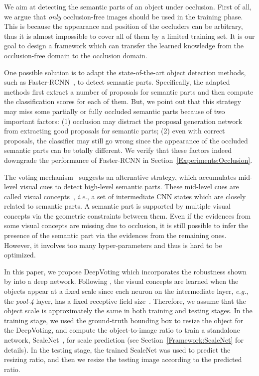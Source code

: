 \documentclass[10pt,twocolumn,letterpaper]{article}
\begin{document}
  We aim at detecting the semantic parts of an object under occlusion. First of all, we argue that {\em only} occlusion-free images should be used in the training phase. This is because the appearance and position of the occluders can be arbitrary, thus it is almost impossible to cover all of them by a limited training set. It is our goal to design a framework which can transfer the learned knowledge from the occlusion-free domain to the occlusion domain.

  One possible solution is to adapt the state-of-the-art object detection methods, such as Faster-RCNN~\cite{Ren_2015_Faster}, to detect semantic parts. Specifically, the adapted methods first extract a number of proposals for semantic parts and then compute the classification scores for each of them. But, we point out that this strategy may miss some partially or fully occluded semantic parts because of two important factors: (1) occlusion may distract the proposal generation network from extracting good proposals for semantic parts; (2) even with correct proposals, the classifier may still go wrong since the appearance of the occluded semantic parts can be totally different. We verify that these factors indeed downgrade the performance of Faster-RCNN in Section~\ref{Experiments:Occlusion}.

  The voting mechanism~\cite{wang2017detecting} suggests an alternative strategy, which accumulates mid-level visual cues to detect high-level semantic parts. These mid-level cues are called visual concepts~\cite{Wang_2017_VC_journal},  {\em i.e.}, a set of intermediate CNN states which are closely related to semantic parts. A semantic part is supported by multiple visual concepts via the geometric constraints between them. Even if the evidences from some visual concepts are missing due to occlusion, it is still possible to infer the presence of the semantic part via the evidences from the remaining ones. However, it involves too many hyper-parameters and thus is hard to be optimized.

  In this paper, we propose DeepVoting which incorporates the robustness shown by \cite{wang2017detecting} into a deep network. Following \cite{Wang_2017_VC_journal}, the visual concepts are learned when the objects appear at a fixed scale since each neuron on the intermediate layer, {\em e.g.}, the {\em pool-4} layer, has a fixed receptive field size~\cite{Simonyan_2015_Very}. Therefore, we assume that the object scale is approximately the same in both training and testing stages. In the training stage, we used the ground-truth bounding box to resize the object for the DeepVoting, and compute the object-to-image ratio to train a standalone network, ScaleNet~\cite{Qiao_2017_ScaleNet}, for scale prediction (see Section~\ref{Framework:ScaleNet} for details). In the testing stage, the trained ScaleNet was used to predict the resizing ratio, and then we resize the testing image according to the predicted ratio.
\end{document}
